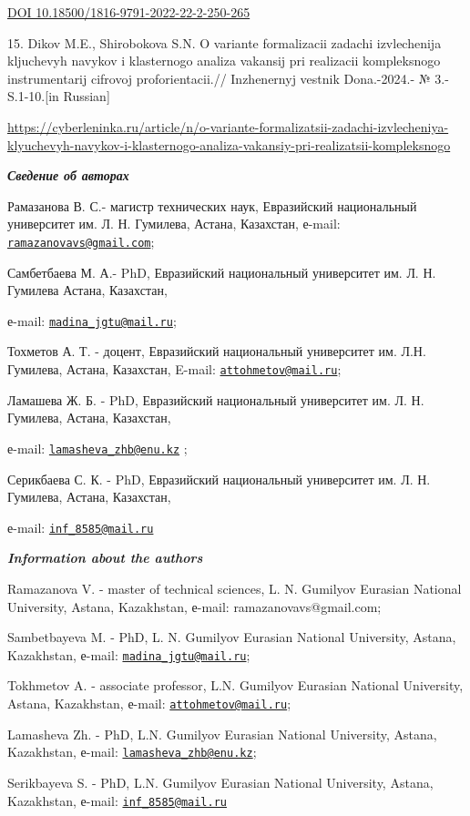 \href{https://doi.org/10.18500/1816-9791-2022-22-2-250-265}{DOI
10.18500/1816-9791-2022-22-2-250-265}

15. Dikov M.E., Shirobokova S.N. O variante formalizacii zadachi
izvlechenija kljuchevyh navykov i klasternogo analiza vakansij pri
realizacii kompleksnogo instrumentarij cifrovoj proforientacii.//
Inzhenernyj vestnik Dona.-2024.- № 3.- S.1-10.{[}in Russian{]}

\url{https://cyberleninka.ru/article/n/o-variante-formalizatsii-zadachi-izvlecheniya-klyuchevyh-navykov-i-klasternogo-analiza-vakansiy-pri-realizatsii-kompleksnogo}

\emph{{\bfseries Сведение об авторах}}

Рамазанова В. С.- магистр технических наук, Евразийский национальный
университет им. Л. Н. Гумилева, Астана, Казахстан, е-mail:
\href{mailto:ramazanovavs@gmail.com}{\nolinkurl{ramazanovavs@gmail.com}};

Самбетбаева М. А.- PhD, Евразийский национальный университет им. Л. Н.
Гумилева Астана, Казахстан,

е-mail:
\href{mailto:madina_jgtu@mail.ru}{\nolinkurl{madina\_jgtu@mail.ru}};

Тохметов А. Т. - доцент, Евразийский национальный университет им. Л.Н.
Гумилева, Астана, Казахстан, E-mail:
\href{mailto:attohmetov@mail.ru}{\nolinkurl{attohmetov@mail.ru}};

Ламашева Ж. Б. - PhD, Евразийский национальный университет им. Л. Н.
Гумилева, Астана, Казахстан,

е-mail:
\href{mailto:lamasheva_zhb@enu.kz}{\nolinkurl{lamasheva\_zhb@enu.kz}} ;

Серикбаева С. К. - PhD, Евразийский национальный университет им. Л. Н.
Гумилева, Астана, Казахстан,

е-mail: \href{mailto:inf_8585@mail.ru}{\nolinkurl{inf\_8585@mail.ru}}

\emph{{\bfseries Information about the authors}}

Ramazanova V. - master of technical sciences, L. N. Gumilyov Eurasian
National University, Astana, Kazakhstan, е-mail: ramazanovavs@gmail.com;

Sambetbayeva M. - PhD, L. N. Gumilyov Eurasian National University,
Astana, Kazakhstan, е-mail:
\href{mailto:madina_jgtu@mail.ru}{\nolinkurl{madina\_jgtu@mail.ru}};

Tokhmetov A. - associate professor, L.N. Gumilyov Eurasian National
University, Astana, Kazakhstan, е-mail:
\href{mailto:attohmetov@mail.ru}{\nolinkurl{attohmetov@mail.ru}};

Lamasheva Zh. - PhD, L.N. Gumilyov Eurasian National University, Astana,
Kazakhstan, е-mail:
\href{mailto:lamasheva_zhb@enu.kz}{\nolinkurl{lamasheva\_zhb@enu.kz}};

Serikbayeva S. - PhD, L.N. Gumilyov Eurasian National University,
Astana, Kazakhstan, е-mail:
\href{mailto:inf_8585@mail.ru}{\nolinkurl{inf\_8585@mail.ru}}
